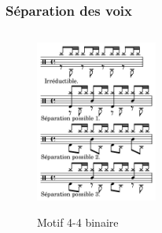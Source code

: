 \subsubsection{Séparation des voix}
\label{sys_sep_voix}
\begin{figure}[h]
	\centering
	\includegraphics[height=60mm, width=40mm]{z_images/3_methodes/2_systemes/1_separation_4-4_binaire.png}
	\caption{Motif 4-4 binaire}
	\label{binaire}
\end{figure}

